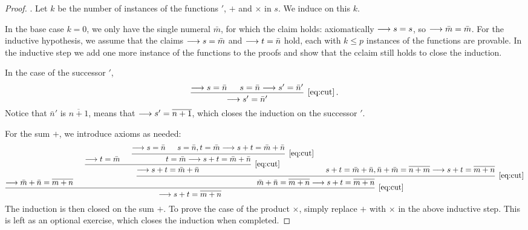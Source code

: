 \begin{proof}.
    Let \(k\) be the number of instances of the functions
    \('\), \(+\) and \(\times\) in \(s\). We induce on this \(k\).

    In the base case \(k=0\), we only have the single numeral \(\bar m\),
    for which the claim holds: axiomatically \(\longrightarrow s=s\), so \(\longrightarrow\bar m=\bar m\).
    For the inductive hypothesis, we assume that the claims \(\longrightarrow s=\bar m\)
    and \(\longrightarrow t=\bar n\) hold, each with \(k\leq p\) instances of the functions are provable.
    In the inductive step we add one more instance of the functions to the proofs
    and show that the cclaim still holds to close the induction.

    In the case of the successor \(\prime\),
    \begin{equation*}
        \begin{prooftree}
            \hypo{\seq s=\bar n}
            \hypo{s=\bar n \seq s'=\bar n'}
            \infer2[\eqref{eq:cut}]{\seq s'=\bar n'}
        \end{prooftree} \,.
    \end{equation*}
    Notice that \(\bar n'\) is \(\overline{n+1}\),
    means that \(\longrightarrow s'=\overline{n+1}\), which closes the induction on
    the successor \(\prime\).

    For the sum \(+\), we introduce axioms as needed:
    \scriptsize
    \begin{equation*}
        \begin{prooftree}
            \hypo{\seq \bar m+\bar n = \overline{m + n}}
            \hypo{\seq t = \bar m}
            \hypo{\seq s = \bar n}
            \hypo{s = \bar n, t = \bar m \seq s + t = \bar m + \bar n}
            \infer2[\eqref{eq:cut}]{t = \bar m \seq s + t = \bar m + \bar n}
            \infer2[\eqref{eq:cut}]{\seq s+t = \bar m + \bar n}
            \hypo{s+t = \bar m + \bar n, \bar n + \bar m = \overline{n + m}\seq s+t = \overline{m + n}}
            \infer2[\eqref{eq:cut}]{\bar m+\bar n = \overline{m + n}\seq s+t = \overline{m + n}}
            \infer2[\eqref{eq:cut}]{\seq s+t=\overline{m + n}}
        \end{prooftree}
    \end{equation*}
    \normalsize
    The induction is then closed on the sum \(+\).
    To prove the case of the product \(\times\), simply replace \(+\)
    with \(\times\) in the above inductive step. This is left as an optional exercise,
    which closes the induction when completed.


\end{proof}
